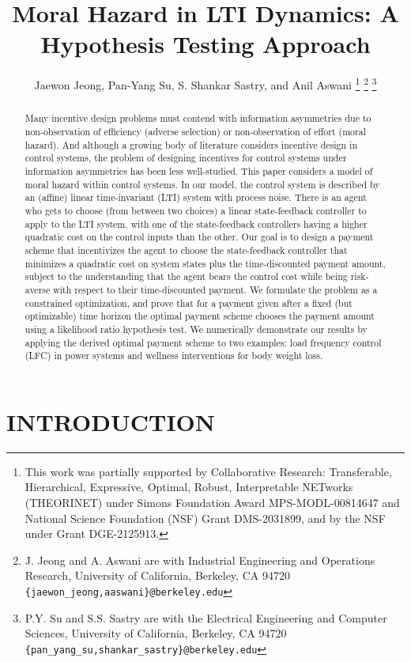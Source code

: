 \documentclass[letterpaper, 10 pt, conference]{ieeeconf}  %
\title{\LARGE \bf
Moral Hazard in LTI Dynamics: A Hypothesis Testing Approach}
\author{Jaewon Jeong, Pan-Yang Su, S. Shankar Sastry, and Anil Aswani%
\thanks{This work was partially supported by Collaborative Research: Transferable, Hierarchical, Expressive, Optimal, Robust, Interpretable NETworks (THEORINET) under Simons Foundation Award MPS-MODL-00814647 and National Science Foundation (NSF) Grant DMS-2031899, and by the NSF under Grant DGE-2125913.}%
\thanks{J. Jeong and A. Aswani are with Industrial Engineering and Operations Research,
        University of California, Berkeley, CA 94720
        {\tt\small \{jaewon\_jeong,aaswani\}@berkeley.edu}}%
\thanks{P.Y. Su and S.S. Sastry are with the Electrical Engineering and Computer Sciences, University of California, Berkeley, CA 94720
        {\tt\small \{pan\_yang\_su,shankar\_sastry\}@berkeley.edu}}%
}
\begin{document}
\maketitle
\thispagestyle{empty}
\pagestyle{empty}


\begin{abstract}
Many incentive design problems must contend with information asymmetries due to non-observation of efficiency (adverse selection) or non-observation of effort (moral hazard). And although a growing body of literature considers incentive design in control systems, the problem of designing incentives for control systems under information asymmetries has been less well-studied. This paper considers a model of moral hazard within control systems. In our model, the control system is described by an (affine) linear time-invariant (LTI) system with process noise. There is an agent who gets to choose (from between two choices) a linear state-feedback controller to apply to the LTI system, with one of the state-feedback controllers having a higher quadratic cost on the control inputs than the other. Our goal is to design a payment scheme that incentivizes the agent to choose the state-feedback controller that minimizes a quadratic cost on system states plus the time-discounted payment amount, subject to the understanding that the agent bears the control cost while being risk-averse with respect to their time-discounted payment. We formulate the problem as a constrained optimization, and prove that for a  payment given after a fixed (but optimizable) time horizon the optimal payment scheme chooses the payment amount using a likelihood ratio hypothesis test. We numerically demonstrate our results by applying the derived optimal payment scheme to two examples: load frequency control (LFC) in power systems and wellness interventions for body weight loss.
\end{abstract}

\section{INTRODUCTION}

\end{document}
